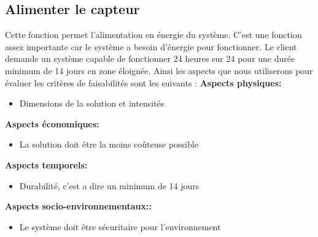 \begin{table}[!htb]
\footnotesize
\centering
{}
\caption{Évaluation globale des concepts pour capter les informations sur les poissons}
\label{t:Decision_capteur}
\end{table}

\subsection{Alimenter le capteur}
 Cette fonction permet l'alimentation en énergie du système. C'est une fonction assez importante car le système a besoin d'énergie pour fonctionner. Le client demande un système capable de fonctionner 24 heures sur 24 pour une durée minimum de 14 jours en zone éloignée. Ainsi les aspects que nous utiliserons pour évaluer les critères de faisabilités sont les suivants : 
 \textbf{Aspects physiques:}
 \begin{itemize} [label = {--}]
    \item Dimensions de la solution et intensités
\end{itemize}
 \textbf{Aspects économiques:}
 \begin{itemize} [label = {--}]
    \item La solution doit être la moins coûteuse possible
\end{itemize}
 \textbf{Aspects temporels:}
 \begin{itemize} [label = {--}]
    \item Durabilité, c'est a dire un minimum de 14 jours
\end{itemize}
 \textbf{Aspects socio-environnementaux::}
 \begin{itemize} [label = {--}]
    \item Le système doit être sécuritaire pour l'environnement
\end{itemize}
